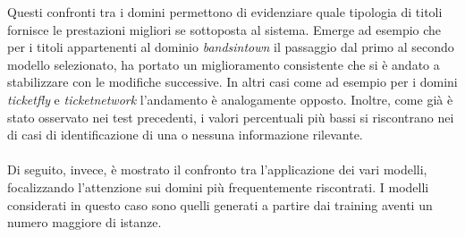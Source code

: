 \documentclass[a4paper]{report}
\begin{document}
Questi confronti tra i domini permettono di evidenziare quale tipologia di titoli fornisce le prestazioni migliori se sottoposta al sistema. Emerge ad esempio che per i titoli appartenenti al dominio \textit{bandsintown} il passaggio dal primo al secondo modello selezionato, ha portato un miglioramento consistente che si è andato a stabilizzare con le modifiche successive. In altri casi come ad esempio per i domini \textit{ticketfly} e \textit{ticketnetwork} l'andamento è analogamente opposto. Inoltre, come già è stato osservato nei test precedenti, i valori percentuali più bassi si riscontrano nei di casi di identificazione di una o nessuna informazione rilevante.
\\ \\
Di seguito, invece, è mostrato il confronto tra l'applicazione dei vari modelli, focalizzando l'attenzione sui domini più frequentemente riscontrati. I modelli considerati in questo caso sono quelli generati a partire dai training aventi un numero maggiore di istanze.
\end{document}
